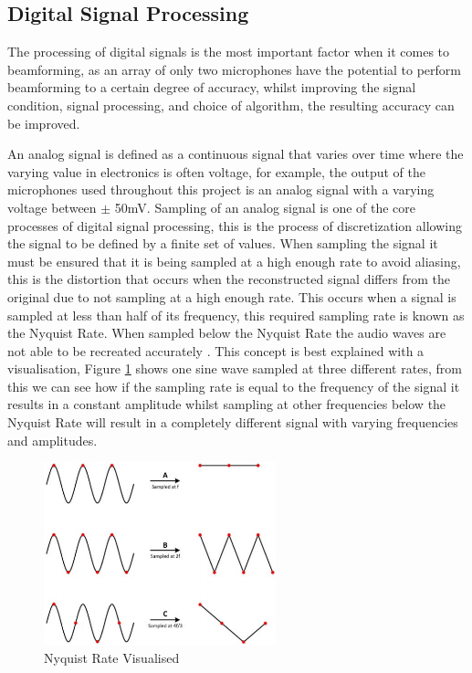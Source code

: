 \documentclass{UoNMCHA}
\numberwithin{equation}{section}
\begin{document}
\newpage
\subsection{Digital Signal Processing} \label{sec:Signal Processing}
    The processing of digital signals is the most important factor when it comes to beamforming, as an array of only two microphones have the potential to perform beamforming to a certain degree of accuracy, whilst improving the signal condition, signal processing, and choice of algorithm, the resulting accuracy can be improved.
    
    An analog signal is defined as a continuous signal that varies over time where the varying value in electronics is often voltage, for example, the output of the microphones used throughout this project is an analog signal with a varying voltage between $\pm$ 50mV. Sampling of an analog signal is one of the core processes of digital signal processing, this is the process of discretization allowing the signal to be defined by a finite set of values. When sampling the signal it must be ensured that it is being sampled at a high enough rate to avoid aliasing, this is the distortion that occurs when the reconstructed signal differs from the original due to not sampling at a high enough rate. This occurs when a signal is sampled at less than half of its frequency, this required sampling rate is known as the Nyquist Rate. When sampled below the Nyquist Rate the audio waves are not able to be recreated accurately \citep{Ben08}. This concept is best explained with a visualisation, Figure \ref{fig:NyquistFrequency} shows one sine wave sampled at three different rates, from this we can see how if the sampling rate is equal to the frequency of the signal it results in a constant amplitude whilst sampling at other frequencies below the Nyquist Rate will result in a completely different signal with varying frequencies and amplitudes. 

    \begin{figure}[H]
        \centering
        \includegraphics[keepaspectratio, width = 0.6\textwidth]{Figures/NyquistFrequency.png}
        \caption{Nyquist Rate Visualised \citep{NINyq}}
        \label{fig:NyquistFrequency}
    \end{figure}
    
\end{document}

